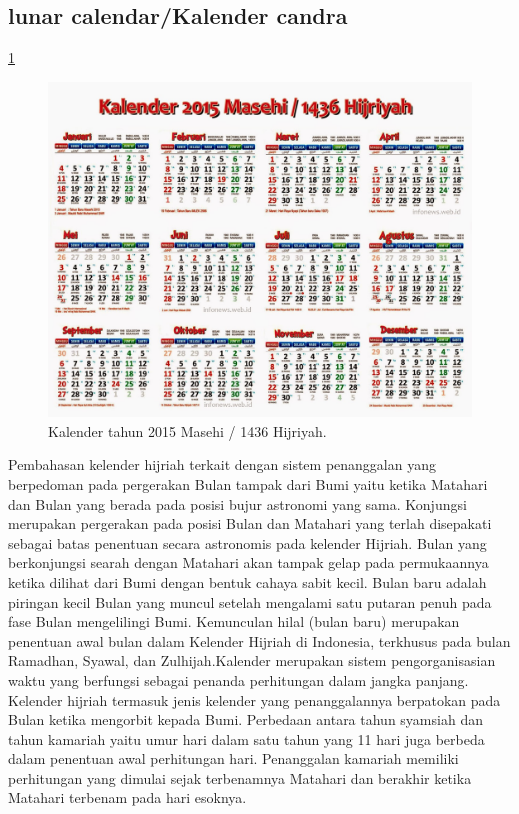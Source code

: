   \subsection{lunar calendar/Kalender candra}
    \ref{Kalender_2015}
    \begin{figure}[ht]
    \centerline{\includegraphics[width=1\textwidth]{figures/Kalender_2015.JPG}}
    \caption{Kalender tahun 2015 Masehi / 1436 Hijriyah.}
    \label{Kalender_2015}
    \end{figure}
    Pembahasan kelender hijriah terkait dengan sistem penanggalan yang berpedoman pada pergerakan Bulan tampak dari Bumi yaitu ketika Matahari dan Bulan yang berada pada posisi bujur astronomi yang sama. Konjungsi merupakan pergerakan pada posisi Bulan dan Matahari yang terlah disepakati sebagai batas penentuan secara astronomis pada kelender Hijriah.
  Bulan yang berkonjungsi searah dengan Matahari akan tampak gelap pada permukaannya ketika dilihat dari Bumi dengan bentuk cahaya sabit kecil. Bulan baru adalah piringan kecil Bulan yang muncul setelah mengalami satu putaran penuh pada fase Bulan mengelilingi Bumi.
  Kemunculan hilal (bulan baru) merupakan penentuan awal bulan dalam Kelender Hijriah di Indonesia, terkhusus pada bulan Ramadhan, Syawal, dan Zulhijah.Kalender merupakan sistem pengorganisasian waktu yang berfungsi sebagai penanda perhitungan dalam jangka panjang. Kelender hijriah termasuk jenis kelender yang penanggalannya berpatokan pada Bulan ketika mengorbit kepada Bumi.
  Perbedaan antara tahun syamsiah dan tahun kamariah yaitu umur hari dalam satu tahun yang 11 hari juga berbeda dalam penentuan awal perhitungan hari. Penanggalan kamariah memiliki perhitungan yang dimulai sejak terbenamnya Matahari dan berakhir ketika Matahari terbenam pada hari esoknya.
